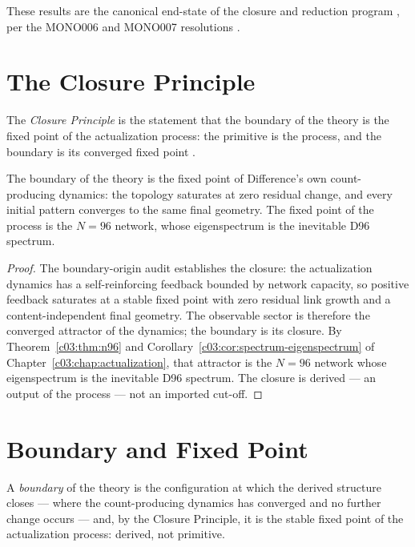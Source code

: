These results are the canonical end-state of the closure and reduction program
\cite{c04:QG267,c04:QG268,c04:QG278,c04:QG282,c04:QG293,c04:QG294}, per the MONO006 and MONO007
resolutions \cite{c04:MONO006,c04:MONO007}.

\section{The Closure Principle}
\label{c04:sec:closure-principle}

\begin{definition}
\label{c04:def:closure-principle}
The \emph{Closure Principle} is the statement that the boundary of the theory is the fixed
point of the actualization process: the primitive is the process, and the boundary is its
converged fixed point \cite{c04:QG282}.
\end{definition}

\begin{theorem}
\label{c04:thm:closure-holds}
The boundary of the theory is the fixed point of Difference's own count-producing dynamics:
the topology saturates at zero residual change, and every initial pattern converges to the
same final geometry. The fixed point of the process is the $N=96$ network, whose eigenspectrum
is the inevitable D96 spectrum.
\end{theorem}

\begin{proof}
The boundary-origin audit \cite{c04:QG282} establishes the closure: the actualization dynamics
has a self-reinforcing feedback bounded by network capacity, so positive feedback saturates
at a stable fixed point with zero residual link growth and a content-independent final
geometry. The observable sector is therefore the converged attractor of the dynamics; the
boundary is its closure. By Theorem~\ref{c03:thm:n96} and
Corollary~\ref{c03:cor:spectrum-eigenspectrum} of Chapter~\ref{c03:chap:actualization}, that
attractor is the $N=96$ network whose eigenspectrum is the inevitable D96 spectrum. The
closure is derived --- an output of the process --- not an imported cut-off.
\end{proof}

\section{Boundary and Fixed Point}
\label{c04:sec:boundary-fixed-point}

\begin{theorem}
\label{c04:thm:boundary-is-fixed}
A \emph{boundary} of the theory is the configuration at which the derived structure closes ---
where the count-producing dynamics has converged and no further change occurs --- and, by
the Closure Principle, it is the stable fixed point of the actualization process: derived,
not primitive.
\end{theorem}

